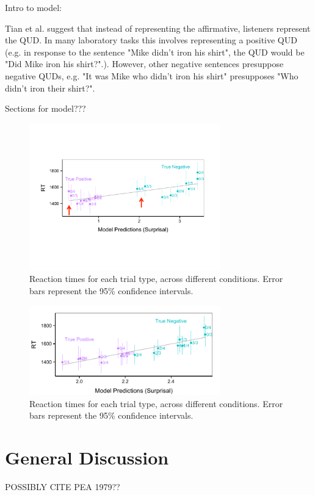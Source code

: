 \documentclass[10pt,letterpaper]{article}
\begin{document}
Intro to model: 

Tian et al. suggest that instead of representing the affirmative, listeners represent the QUD.  In many laboratory tasks this involves representing a positive QUD (e.g. in response to the sentence "Mike didn't iron his shirt", the QUD would be "Did Mike iron his shirt?".).  However, other negative sentences presuppose negative QUDs, e.g. "It was Mike who didn't iron his shirt" presupposes "Who didn't iron their shirt?".  

Sections for model???

\begin{figure}
\begin{center} 
\includegraphics[width=3.25in]{figures/model1_comparison.pdf}
\caption{\label{fig:addition_subs} Reaction times for each trial type, across different conditions.  Error bars represent the 95\% confidence intervals.}
\end{center} 
\end{figure}

\begin{figure}
\begin{center} 
\includegraphics[width=3.25in]{figures/model2_comparison.pdf}
\caption{\label{fig:addition_subs} Reaction times for each trial type, across different conditions.  Error bars represent the 95\% confidence intervals.}
\end{center} 
\end{figure}


\section{General Discussion}
POSSIBLY CITE PEA 1979??
\end{document}
